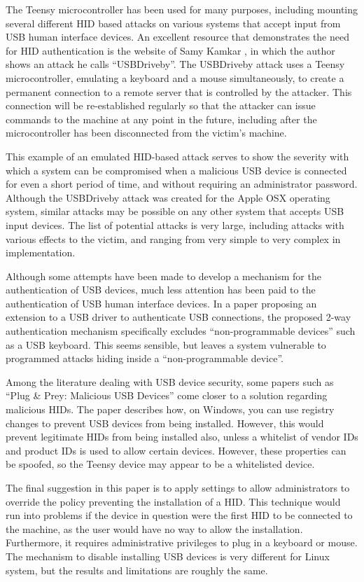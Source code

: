 \documentclass[pagenumbers]{ieee}
\begin{document}
The Teensy microcontroller has been used for many purposes, including mounting several different HID based attacks on various systems that accept input from USB human interface devices. An excellent resource that demonstrates the need for HID authentication is the website of Samy Kamkar \cite{samy}, in which the author shows an attack he calls ``USBDriveby''. The USBDriveby attack uses a Teensy microcontroller, emulating a keyboard and a mouse simultaneously,  to create a permanent connection to a remote server that is controlled by the attacker.  This connection will be re-established regularly so that the attacker can issue commands to the machine at any point in the future, including after the microcontroller has been disconnected from the victim's machine.

This example of an emulated HID-based attack serves to show the severity with which a system can be compromised when a malicious USB device is connected for even a short period of time, and without requiring an administrator password. Although the USBDriveby attack was created for the Apple OSX operating system, similar attacks may be possible on any other system that accepts USB input devices. The list of potential attacks is very large, including attacks with various effects to the victim, and ranging from very simple to very complex in implementation.

Although some attempts have been made to develop a mechanism for the authentication of USB devices, much less attention has been paid to the authentication of USB human interface devices. In a paper \cite{wang} proposing an extension to a USB driver to authenticate USB connections, the proposed 2-way authentication mechanism specifically excludes ``non-programmable devices'' such as a USB keyboard. This seems sensible, but leaves a system vulnerable to programmed attacks hiding inside a ``non-programmable device''.

Among the literature dealing with USB device security, some papers such as ``Plug \& Prey: Malicious USB Devices'' \cite{crenshaw} come closer to a solution regarding malicious HIDs. The paper describes how, on Windows, you can use registry changes to prevent USB devices from being installed. However, this would prevent legitimate HIDs from being installed also, unless a whitelist of vendor IDs and product IDs is used to allow certain devices. However, these properties can be spoofed, so the Teensy device may appear to be a whitelisted device.

The final suggestion in this paper is to apply settings to allow administrators to override the policy preventing the installation of a HID. This technique would run into problems if the device in question were the first HID to be connected to the machine, as the user would have no way to allow the installation. Furthermore, it requires administrative privileges to plug in a keyboard or mouse. The mechanism to disable installing USB devices is very different for Linux system, but the results and limitations are roughly the same.
\end{document}
